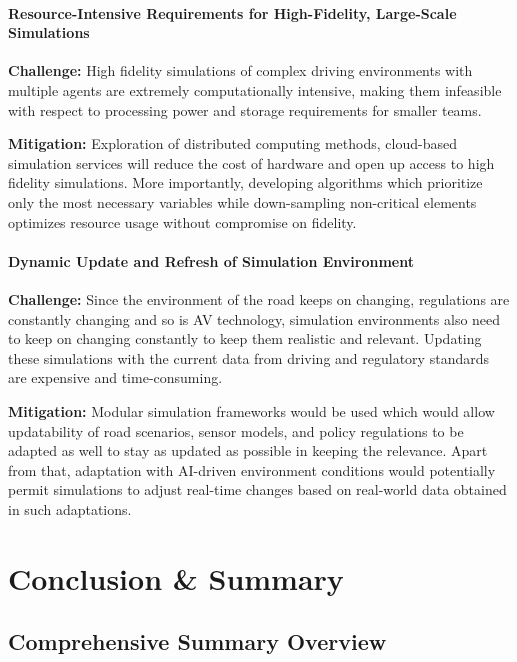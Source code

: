 \documentclass[lettersize,journal]{IEEEtran}
\begin{document}
\paragraph{Resource-Intensive Requirements for High-Fidelity, Large-Scale Simulations}

\textbf{Challenge:} High fidelity simulations of complex driving environments with multiple agents are extremely computationally intensive, making them infeasible with respect to processing power and storage requirements for smaller teams.

\textbf{Mitigation:} Exploration of distributed computing methods, cloud-based simulation services will reduce the cost of hardware and open up access to high fidelity simulations. More importantly, developing algorithms which prioritize only the most necessary variables while down-sampling non-critical elements optimizes resource usage without compromise on fidelity.

\paragraph{Dynamic Update and Refresh of Simulation Environment}

\textbf{Challenge:} Since the environment of the road keeps on changing, regulations are constantly changing and so is AV technology, simulation environments also need to keep on changing constantly to keep them realistic and relevant. Updating these simulations with the current data from driving and regulatory standards are expensive and time-consuming.

\textbf{Mitigation:} Modular simulation frameworks would be used which would allow updatability of road scenarios, sensor models, and policy regulations to be adapted as well to stay as updated as possible in keeping the relevance. Apart from that, adaptation with AI-driven environment conditions would potentially permit simulations to adjust real-time changes based on real-world data obtained in such adaptations.


\section{Conclusion & Summary}

\subsection{Comprehensive Summary Overview}
\end{document}
